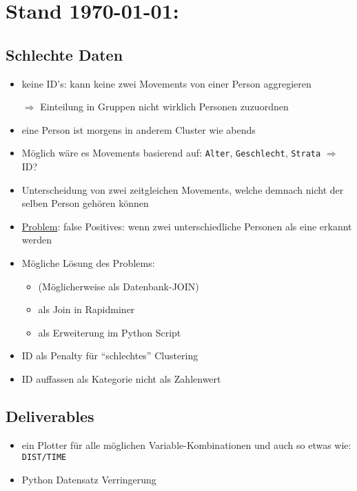 \documentclass[11pt]{article}
\begin{document}
\section*{Stand \today:}
\subsection*{Schlechte Daten}
\begin{itemize}
	\item keine ID's: kann keine zwei Movements von einer Person aggregieren
	\item[$\Rightarrow$] Einteilung in Gruppen nicht wirklich Personen zuzuordnen
	\item eine Person ist morgens in anderem Cluster wie abends
	\item[]
	\item Möglich wäre es Movements basierend auf: \texttt{Alter}, \texttt{Geschlecht}, \texttt{Strata} $\Rightarrow$ ID?
	\item Unterscheidung von zwei zeitgleichen Movements, welche demnach nicht der selben Person gehören können
	\item \underline{Problem}: false Positives: wenn zwei unterschiedliche Personen als eine erkannt werden
	\item Mögliche Lösung des Problems:
		\begin{itemize}
			\item (Möglicherweise als Datenbank-JOIN)
			\item als Join in Rapidminer
			\item als Erweiterung im Python Script
		\end{itemize}	
	\item ID als Penalty für ``schlechtes'' Clustering
	\item ID auffassen als Kategorie nicht als Zahlenwert
\end{itemize}

\subsection*{Deliverables}
\begin{itemize}
	\item ein Plotter für alle möglichen Variable-Kombinationen und auch so etwas wie: \texttt{DIST/TIME}
	\item Python Datensatz Verringerung
\end{itemize}
\end{document}
